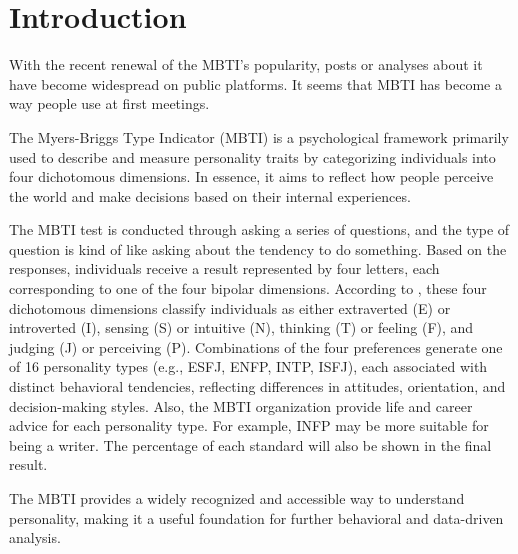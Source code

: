 \documentclass[12pt]{article}
\numberwithin{figure}{section}  %
\begin{document}
	\tableofcontents
	\newpage
	
	\setcounter{page}{1}
	
	
	
	\section{Introduction}
	With the recent renewal of the MBTI's popularity, posts or analyses about it
	have become widespread on public platforms. It seems that MBTI has become a
	way people use at first meetings.
	
	The Myers-Briggs Type Indicator (MBTI) is a psychological framework
	primarily used to describe and measure personality traits by categorizing
	individuals into four dichotomous dimensions. In essence, it aims to reflect
	how people perceive the world and make decisions based on their internal
	experiences\cite{yang2022research}.
	
	The MBTI test is conducted through asking a series of questions, and the
	type of question is kind of like asking about the tendency to do something.
	Based on the responses, individuals receive a result represented by four
	letters, each corresponding to one of the four bipolar dimensions. According
	to , these four dichotomous dimensions classify
	individuals as either extraverted (E) or introverted (I), sensing (S) or
	intuitive (N), thinking (T) or feeling (F), and judging (J) or perceiving
	(P). Combinations of the four preferences generate one of 16 personality
	types (e.g., ESFJ, ENFP, INTP, ISFJ), each associated with distinct
	behavioral tendencies, reflecting differences in attitudes, orientation, and
	decision-making styles. Also, the MBTI organization provide life and career
	advice for each personality type. For example, INFP may be more suitable for
	being a writer. The percentage of each standard will also be shown in the final
	result.
	
	The MBTI provides a widely recognized and accessible way to understand
	personality, making it a useful foundation for further behavioral and
	data-driven analysis.
	
\end{document}
